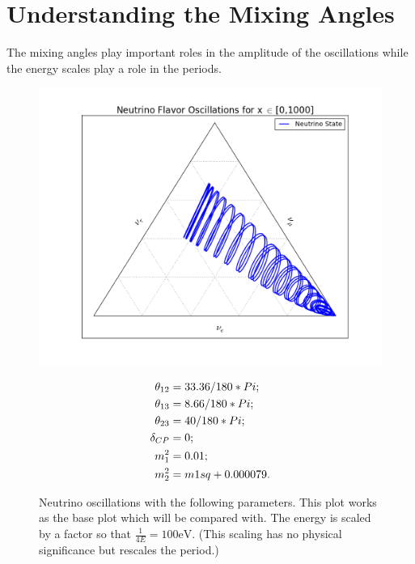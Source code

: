 \documentclass[letterpaper,12pt,english]{sphinxmanual}
\begin{document}
\section{Understanding the Mixing Angles}
\label{vacuum:understanding-the-mixing-angles}
The mixing angles play important roles in the amplitude of the oscillations while the energy scales play a role in the periods.
\begin{figure}[htbp]
\centering
\capstart

\includegraphics{1000-1.png}
\caption{Neutrino oscillations with the following parameters. This plot works as the base plot which will be compared with. The energy is scaled by a factor so that \(\frac{1}{4E}=100\mathrm{eV}\). (This scaling has no physical significance but rescales the period.)}{\small \begin{gather}
\begin{split}\theta_{12} &= 33.36/180*Pi; \\
\theta_{13} &= 8.66/180*Pi; \\
\theta_{23} &= 40/180*Pi;\\
\delta_{CP} &= 0;\\
m_1^2 &= 0.01;\\
m_2^2 &= m1sq + 0.000079.\end{split}\notag
\end{gather}}\end{figure}
\end{document}
